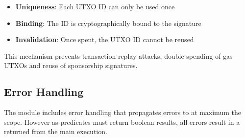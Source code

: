 \begin{itemize}
\item \textbf{Uniqueness}: Each UTXO ID can only be used once
\item \textbf{Binding}: The ID is cryptographically bound to the signature
\item \textbf{Invalidation}: Once spent, the UTXO ID cannot be reused
\end{itemize}

This mechanism prevents transaction replay attacks, double-spending of gas UTXOs and reuse of sponsorship signatures. \\



\subsection{Error Handling}
The module includes error handling that propagates errors to at maximum the  scope. However as predicates
must return boolean results, all errors result in a  returned from the main execution.



